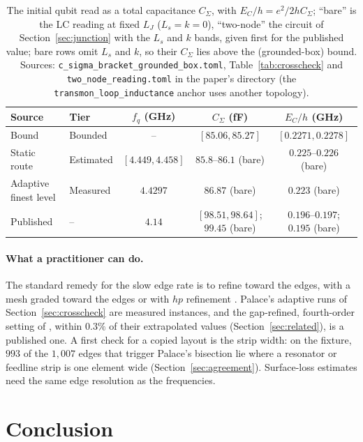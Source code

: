 \documentclass{anvil-paper}
\begin{document}
\begin{table}[htbp]
  \centering
  \caption{The initial qubit read as a total capacitance $C_\Sigma$, with
  $E_C/h = e^2/2hC_\Sigma$; ``bare'' is the LC reading at fixed $L_J$
  ($L_s = k = 0$), ``two-node'' the circuit of
  Section~\ref{sec:junction} with the $L_s$ and $k$ bands, given first for
  the published value; bare rows omit $L_s$ and $k$, so their $C_\Sigma$
  lies above the (grounded-box) bound. Sources:
  \texttt{c\_sigma\_bracket\_grounded\_box.toml}, Table~\ref{tab:crosscheck}
  and \texttt{two\_node\_reading.toml} in the paper's directory (the
  \texttt{transmon\_loop\_inductance} anchor uses another topology).}
  \label{tab:design}
  \footnotesize
  \begin{tabular}{@{}llccc@{}}
    \toprule
    Source & Tier & $f_q$ (GHz) & $C_\Sigma$ (fF) & $E_C/h$ (GHz) \\
    \midrule
    Bound & Bounded & -- & $[85.06, 85.27]$ & $[0.2271, 0.2278]$ \\
    Static route & Estimated & $[4.449, 4.458]$ & $85.8$--$86.1$ (bare) & $0.225$--$0.226$ (bare) \\
    Adaptive finest level & Measured & $4.4297$ & $86.87$ (bare) & $0.223$ (bare) \\
    Published & -- & $4.14$ & $[98.51, 98.64]$; $99.45$ (bare) & $0.196$--$0.197$; $0.195$ (bare) \\
    \bottomrule
  \end{tabular}
\end{table}

\paragraph{What a practitioner can do.}
The standard remedy for the slow edge rate is to refine toward the edges,
with a mesh graded toward the edges or with $hp$ refinement
\citep{demkowicz2006computing}. Palace's adaptive runs of
Section~\ref{sec:crosscheck} are measured instances, and the gap-refined,
fourth-order setting of \citet{ye2025electromagnetic}, within $0.3\%$ of
their extrapolated values (Section~\ref{sec:related}), is a published one.
A first check for a copied layout is the strip width: on the fixture, $993$ of the $1{,}007$
edges that trigger Palace's bisection lie where a resonator or feedline
strip is one element wide (Section~\ref{sec:agreement}). Surface-loss estimates \citep{wang2015surface,martinis2022surface} need
the same edge resolution as the frequencies.

\section{Conclusion}
\label{sec:conclusion}
\end{document}
